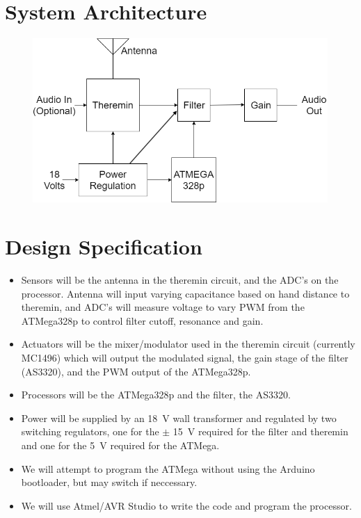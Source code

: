\documentclass[a4paper,12pt]{article}
\begin{document}
\section{System Architecture}
	\begin{figure}[H]
\includegraphics[width = \textwidth]{Theremizer_HighLevel_BD.png}
	\end{figure}

\section{Design Specification}
\begin{itemize}
	\item Sensors will be the antenna in the theremin circuit, and the ADC's on the processor. Antenna will input varying capacitance based on hand distance to theremin, and ADC's will measure voltage to vary PWM from the ATMega328p to control filter cutoff, resonance and gain.
	\item Actuators will be the mixer/modulator used in the theremin circuit (currently MC1496) which will output the modulated signal, the gain stage of the filter (AS3320), and the PWM output of the ATMega328p.
	\item Processors will be the ATMega328p and the filter, the AS3320.
	\item Power will be supplied by an \SI{18}{\volt} wall transformer and regulated by two switching regulators, one for the $\pm$ \SI{15}{\volt} required for the filter and theremin and one for the \SI{5}{\volt} required for the ATMega.
	\item We will attempt to program the ATMega without using the Arduino bootloader, but may switch if neccessary. 
	\item We will use Atmel/AVR Studio to write the code and program the processor.
\end{itemize}
\end{document}
